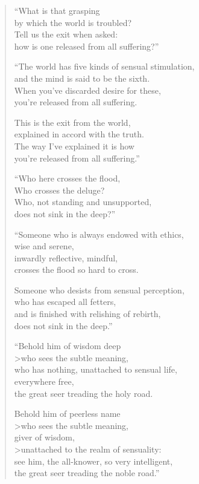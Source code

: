 \documentclass[12pt,openany]{book}%
\begin{document}
\begin{verse}
“What is that grasping \\
by which the world is troubled? \\
Tell us the exit when asked: \\
how is one released from all suffering?” 

“The world has five kinds of sensual stimulation, \\
and the mind is said to be the sixth. \\
When you’ve discarded desire for these, \\
you’re released from all suffering. 

This is the exit from the world, \\
explained in accord with the truth. \\
The way I’ve explained it is how \\
you’re released from all suffering.” 

“Who here crosses the flood, \\
Who crosses the deluge? \\
Who, not standing and unsupported, \\
does not sink in the deep?” 

“Someone who is always endowed with ethics, \\
wise and serene, \\
inwardly reflective, mindful, \\
crosses the flood so hard to cross. 

Someone who desists from sensual perception, \\
who has escaped all fetters, \\
and is finished with relishing of rebirth, \\
does not sink in the deep.” 

“Behold him of wisdom deep \\>who sees the subtle meaning, \\
who has nothing, unattached to sensual life, \\
everywhere free, \\
the great seer treading the holy road. 

Behold him of peerless name \\>who sees the subtle meaning, \\
giver of wisdom, \\>unattached to the realm of sensuality: \\
see him, the all-knower, so very intelligent, \\
the great seer treading the noble road.” 


\end{verse}
\end{document}

